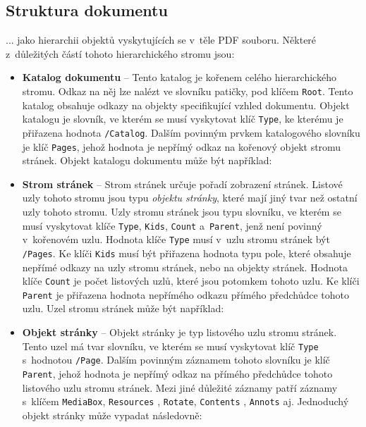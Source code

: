 

\subsection*{Struktura dokumentu}
... jako hierarchii objektů vyskytujících se v~těle PDF souboru.
Některé z~důležitých částí tohoto hierarchického stromu jsou:
\begin{itemize}
    \item \textbf{Katalog dokumentu} -- Tento katalog je kořenem celého
    hierarchického stromu. Odkaz na něj lze nalézt ve slovníku patičky, pod klíčem
    \texttt{Root}. Tento katalog obsahuje odkazy na objekty specifikující vzhled
    dokumentu. Objekt katalogu je slovník, ve kterém se musí vyskytovat klíč
    \texttt{Type}, ke kterému je přiřazena hodnota \texttt{/Catalog}. Dalším
    povinným prvkem katalogového slovníku je klíč \texttt{Pages}, jehož hodnota je
    nepřímý odkaz na kořenový objekt stromu stránek. Objekt katalogu dokumentu
    může být například:

    \item \textbf{Strom stránek} -- Strom stránek určuje pořadí zobrazení stránek.
    Listové uzly tohoto stromu jsou typu \emph{objektu stránky}, které mají jiný
    tvar než ostatní uzly tohoto stromu. Uzly stromu stránek jsou typu slovníku,
    ve kterém se musí vyskytovat klíče \texttt{Type}, \texttt{Kids},
    \texttt{Count} a~\texttt{Parent}, jenž není povinný v~kořenovém uzlu.
    Hodnota klíče \texttt{Type} musí v~uzlu stromu stránek být \texttt{/Pages}.
    Ke klíči \texttt{Kids} musí být přiřazena hodnota typu pole, které obsahuje
    nepřímé odkazy na uzly stromu stránek, nebo na objekty stránek. Hodnota klíče
    \texttt{Count} je počet listových uzlů, které jsou potomkem tohoto uzlu. Ke
    klíči \texttt{Parent} je přiřazena hodnota nepřímého odkazu přímého předchůdce
    tohoto uzlu. Uzel stromu stránek může být například:

    \item \textbf{Objekt stránky} -- Objekt stránky je typ listového uzlu stromu
    stránek. Tento uzel má tvar slovníku, ve kterém se musí vyskytovat klíč
    \texttt{Type} s~hodnotou \texttt{/Page}. Dalším povinným záznamem tohoto
    slovníku je klíč \texttt{Parent}, jehož hodnota je nepřímý odkaz na přímého
    předchůdce tohoto listového uzlu stromu stránek. Mezi jiné důležité záznamy
    patří záznamy s~klíčem \texttt{MediaBox}, \texttt{Resources} , \texttt{Rotate},
    \texttt{Contents} , \texttt{Annots} aj.
    Jednoduchý objekt stránky může vypadat následovně:
\end{itemize}



